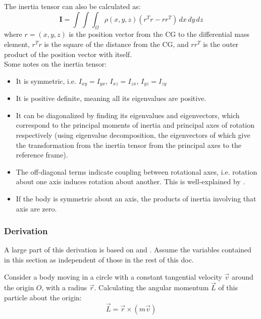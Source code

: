 The inertia tensor can also be calculated as:
\begin{equation} \nonumber
    \mathbf{I} = \int\int\int_\Omega \rho(x,y,z)
    (r^Tr-rr^T) \, dx \, dy \, dz
\end{equation}
where \( r = (x, y, z)\) is the position vector from the CG to the differential mass element, \(r^Tr\) is the square of the distance from the CG, and \(rr^T\) is the outer product of the position vector with itself. \\
Some notes on the inertia tensor:
\begin{itemize}
    \item It is symmetric, i.e. \( I_{xy} = I_{yx} \), \( I_{xz} = I_{zx} \), \( I_{yz} = I_{zy} \)
    \item It is positive definite, meaning all its eigenvalues are positive.
    \item It can be diagonalized by finding its eigenvalues and eigenvectors, which correspond to the principal moments of inertia and principal axes of rotation respectively (using eigenvalue decomposition, the eigenvectors of which give the transformation from the inertia tensor from the principal axes to the reference frame).
    \item The off-diagonal terms indicate coupling between rotational axes, i.e. rotation about one axis induces rotation about another. This is well-explained by \cite{veritasium01}.
    \item If the body is symmetric about an axis, the products of inertia involving that axis are zero.
\end{itemize}

\subsubsection{Derivation}
A large part of this derivation is based on \cite{blackedout01} and \cite{gmu_mech}. Assume the variables contained in this section as independent of those in the rest of this doc.

Consider a body moving in a circle with a constant tangential velocity \(\vec{v}\) around the origin \(O\), with a radius \(\vec{r}\). Calculating the angular momentum \(\vec{L}\) of this particle about the origin:
\begin{equation} \nonumber
    \vec{L} = \vec{r} \times (m \vec{v})
\end{equation}


